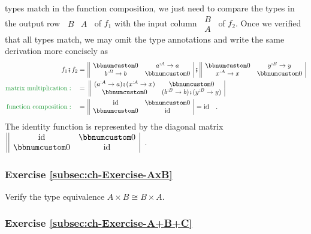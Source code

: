 types match in the function composition, we just need to compare the
types in the output row $\,\begin{array}{||cc|}
B & A\end{array}\,$ of $f_{1}$ with the input column $\,\begin{array}{||c|}
B\\
A
\end{array}\,$ of $f_{2}$. Once we verified that all types match, we may omit the
type annotations and write the same derivation more concisely as
\begin{align*}
f_{1}\bef f_{2} & =\,\begin{array}{||cc|}
\bbnum 0 & a^{:A}\rightarrow a\\
b^{:B}\rightarrow b & \bbnum 0
\end{array}\,\bef\,\begin{array}{||cc|}
\bbnum 0 & y^{:B}\rightarrow y\\
x^{:A}\rightarrow x & \bbnum 0
\end{array}\\
{\color{greenunder}\text{matrix multiplication}:}\quad & =\,\,\begin{array}{||cc|}
(a^{:A}\rightarrow a)\bef(x^{:A}\rightarrow x) & \bbnum 0\\
\bbnum 0 & (b^{:B}\rightarrow b)\bef(y^{:B}\rightarrow y)
\end{array}\\
{\color{greenunder}\text{function composition}:}\quad & =\,\begin{array}{||cc|}
\text{id} & \bbnum 0\\
\bbnum 0 & \text{id}
\end{array}\,=\text{id}\quad.
\end{align*}
The identity function is represented by the diagonal matrix $\,\begin{array}{||cc|}
\text{id} & \bbnum 0\\
\bbnum 0 & \text{id}
\end{array}$~.

\subsubsection{Exercise \label{subsec:ch-Exercise-AxB}\ref{subsec:ch-Exercise-AxB}}

Verify the type equivalence $A\times B\cong B\times A$.

\subsubsection{Exercise \label{subsec:ch-Exercise-A+B+C}\ref{subsec:ch-Exercise-A+B+C}}

